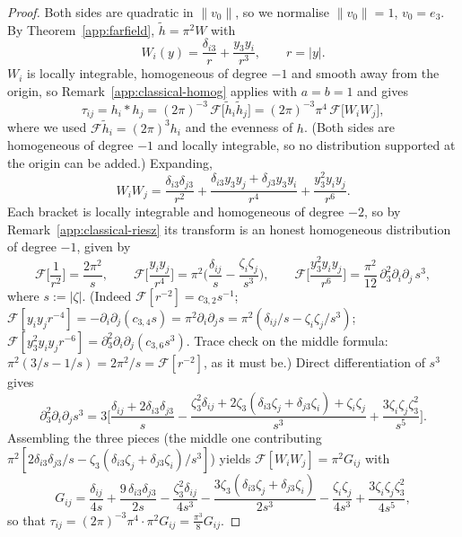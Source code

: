 \begin{proof}
Both sides are quadratic in $\|v_0\|$, so we normalise $\|v_0\|=1$,
$v_0=e_3$. By Theorem~\ref{app:farfield}, $\widetilde h=\pi^2W$ with
\[
W_i(y)=\frac{\delta_{i3}}{r}+\frac{y_3y_i}{r^3},\qquad r=|y| .
\]
$W_i$ is locally integrable, homogeneous of degree $-1$ and smooth away
from the origin, so Remark~\ref{app:classical-homog} applies with
$a=b=1$ and gives
\[
\tau_{ij}=h_i*h_j=(2\pi)^{-3}\,\mathcal F\big[\widetilde h_i\widetilde h_j\big]
=(2\pi)^{-3}\pi^4\,\mathcal F\big[W_iW_j\big],
\]
where we used $\mathcal F\widetilde h_i=(2\pi)^3h_i$ and the evenness of
$h$. (Both sides are homogeneous of degree $-1$ and locally integrable,
so no distribution supported at the origin can be added.) Expanding,
\[
W_iW_j=\frac{\delta_{i3}\delta_{j3}}{r^{2}}
+\frac{\delta_{i3}y_3y_j+\delta_{j3}y_3y_i}{r^{4}}
+\frac{y_3^{2}y_iy_j}{r^{6}} .
\]
Each bracket is locally integrable and homogeneous of degree $-2$, so by
Remark~\ref{app:classical-riesz} its transform is an honest homogeneous
distribution of degree $-1$, given by
\[
\mathcal F\Big[\frac1{r^{2}}\Big]=\frac{2\pi^{2}}{s},
\qquad
\mathcal F\Big[\frac{y_iy_j}{r^{4}}\Big]
=\pi^{2}\Big(\frac{\delta_{ij}}{s}-\frac{\zeta_i\zeta_j}{s^{3}}\Big),
\qquad
\mathcal F\Big[\frac{y_3^{2}y_iy_j}{r^{6}}\Big]
=\frac{\pi^{2}}{12}\,\partial_3^{2}\partial_i\partial_j\,s^{3},
\]
where $s:=|\zeta|$. (Indeed $\mathcal F[r^{-2}]=c_{3,2}s^{-1}$;
$\mathcal F[y_iy_jr^{-4}]=-\partial_i\partial_j(c_{3,4}s)
=\pi^2\partial_i\partial_js=\pi^2(\delta_{ij}/s-\zeta_i\zeta_j/s^3)$;
$\mathcal F[y_3^2y_iy_jr^{-6}]
=\partial_3^2\partial_i\partial_j(c_{3,6}s^3)$. Trace check on the
middle formula: $\pi^2(3/s-1/s)=2\pi^2/s=\mathcal F[r^{-2}]$, as it must
be.) Direct differentiation of $s^3$ gives
\[
\partial_3^{2}\partial_i\partial_j s^{3}
=3\Big[\frac{\delta_{ij}+2\delta_{i3}\delta_{j3}}{s}
-\frac{\zeta_3^{2}\delta_{ij}
+2\zeta_3(\delta_{i3}\zeta_j+\delta_{j3}\zeta_i)+\zeta_i\zeta_j}{s^{3}}
+\frac{3\zeta_i\zeta_j\zeta_3^{2}}{s^{5}}\Big].
\]
Assembling the three pieces (the middle one contributing
$\pi^2[2\delta_{i3}\delta_{j3}/s-\zeta_3(\delta_{i3}\zeta_j
+\delta_{j3}\zeta_i)/s^3]$) yields
$\mathcal F[W_iW_j]=\pi^{2}G_{ij}$ with
\[
G_{ij}=\frac{\delta_{ij}}{4s}
+\frac{9\,\delta_{i3}\delta_{j3}}{2s}
-\frac{\zeta_3^{2}\delta_{ij}}{4s^{3}}
-\frac{3\zeta_3(\delta_{i3}\zeta_j+\delta_{j3}\zeta_i)}{2s^{3}}
-\frac{\zeta_i\zeta_j}{4s^{3}}
+\frac{3\zeta_i\zeta_j\zeta_3^{2}}{4s^{5}} ,
\]
so that $\tau_{ij}=(2\pi)^{-3}\pi^{4}\cdot\pi^{2}G_{ij}
=\frac{\pi^{3}}{8}G_{ij}$.


\end{proof}
